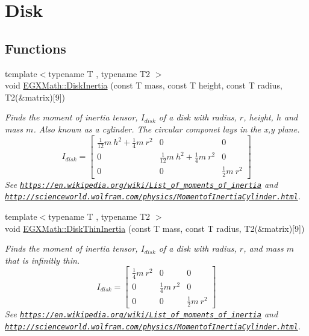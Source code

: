 \hypertarget{group___e_g_x_math-_geometry-3_d-_disk}{}\section{Disk}
\label{group___e_g_x_math-_geometry-3_d-_disk}
\subsection*{Functions}
\begin{DoxyCompactItemize}
\item 
{\footnotesize template$<$typename T , typename T2 $>$ }\\void \mbox{\hyperlink{group___e_g_x_math-_geometry-3_d-_disk_ga6ed461694b277e36a641a6550bdea68f}{E\+G\+X\+Math\+::\+Disk\+Inertia}} (const T mass, const T height, const T radius, T2(\&matrix)\mbox{[}9\mbox{]})
\begin{DoxyCompactList}\small\item\em Finds the moment of inertia tensor, $I_{disk}$ of a disk with radius, $r$, height, $h$ and mass $m$. Also known as a cylinder. The circular componet lays in the x,y plane. \[ I_{disk}=\begin{bmatrix} \frac{1}{12}m\ h^2 + \frac{1}{4}m\ r^2 & 0 & 0\\ 0 & \frac{1}{12}m\ h^2 + \frac{1}{4}m\ r^2 & 0\\ 0 & 0 & \frac{1}{2}m\ r^2 \end{bmatrix} \] See \href{https://en.wikipedia.org/wiki/List_of_moments_of_inertia}{\tt https\+://en.\+wikipedia.\+org/wiki/\+List\+\_\+of\+\_\+moments\+\_\+of\+\_\+inertia} and \href{http://scienceworld.wolfram.com/physics/MomentofInertiaCylinder.html}{\tt http\+://scienceworld.\+wolfram.\+com/physics/\+Momentof\+Inertia\+Cylinder.\+html}. \end{DoxyCompactList}\item 
{\footnotesize template$<$typename T , typename T2 $>$ }\\void \mbox{\hyperlink{group___e_g_x_math-_geometry-3_d-_disk_ga8dcadf6cd5680294a84311c6767e3caf}{E\+G\+X\+Math\+::\+Disk\+Thin\+Inertia}} (const T mass, const T radius, T2(\&matrix)\mbox{[}9\mbox{]})
\begin{DoxyCompactList}\small\item\em Finds the moment of inertia tensor, $I_{disk}$ of a disk with radius, $r$, and mass $m$ that is infinitly thin. \[ I_{disk}=\begin{bmatrix} \frac{1}{4}m\ r^2 & 0 & 0\\ 0 & \frac{1}{4}m\ r^2 & 0\\ 0 & 0 & \frac{1}{2}m\ r^2 \end{bmatrix} \] See \href{https://en.wikipedia.org/wiki/List_of_moments_of_inertia}{\tt https\+://en.\+wikipedia.\+org/wiki/\+List\+\_\+of\+\_\+moments\+\_\+of\+\_\+inertia} and \href{http://scienceworld.wolfram.com/physics/MomentofInertiaCylinder.html}{\tt http\+://scienceworld.\+wolfram.\+com/physics/\+Momentof\+Inertia\+Cylinder.\+html}. \end{DoxyCompactList}\item 

\end{DoxyCompactItemize}
